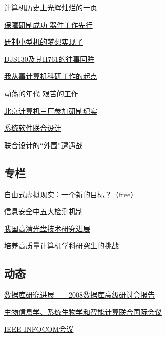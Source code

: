 \documentclass[a4paper]{article}
\begin{document}
\href{http://history.ccf.org.cn/resources/1190201776262/2010/04/15/039022.pdf}{计算机历史上光辉灿烂的一页}

\href{http://history.ccf.org.cn/resources/1190201776262/2010/04/15/039024.pdf}{保障研制成功 器件工作先行}

\href{http://history.ccf.org.cn/resources/1190201776262/2010/04/15/039027.pdf}{研制小型机的梦想实现了}

\href{http://history.ccf.org.cn/resources/1190201776262/2010/04/15/039030.pdf}{DJS130及其H761的往事回眸}

\href{http://history.ccf.org.cn/resources/1190201776262/2010/04/15/039035.pdf}{我从事计算机科研工作的起点}

\href{http://history.ccf.org.cn/resources/1190201776262/2010/04/15/039038.pdf}{动荡的年代  艰苦的工作}

\href{http://history.ccf.org.cn/resources/1190201776262/2010/04/15/039041.pdf}{北京计算机三厂参加研制纪实}

\href{http://history.ccf.org.cn/resources/1190201776262/2010/04/15/039043.pdf}{系统软件联合设计}

\href{http://history.ccf.org.cn/resources/1190201776262/2010/04/15/039044.pdf}{联合设计的“外围”遭遇战}

\subsection{专栏}
\href{http://history.ccf.org.cn/resources/1190201776262/2010/04/15/039048.pdf}{自由式虚拟现实：一个新的目标？（free）}

\href{http://history.ccf.org.cn/resources/1190201776262/2010/04/15/039054.pdf}{信息安全中五大检测机制}

\href{http://history.ccf.org.cn/resources/1190201776262/2010/04/15/039050.pdf}{我国高清光盘技术研究进展}

\href{http://history.ccf.org.cn/resources/1190201776262/2010/04/15/039052.pdf}{培养高质量计算机学科研究生的挑战}

\subsection{动态}
\href{http://history.ccf.org.cn/resources/1190201776262/2010/04/15/039058.pdf}{数据库研究进展——2008数据库高级研讨会报告}

\href{http://history.ccf.org.cn/resources/1190201776262/2010/04/15/039065.pdf}{生物信息学、系统生物学和智能计算联合国际会议}

\href{http://history.ccf.org.cn/resources/1190201776262/2010/04/15/039066.pdf}{IEEE INFOCOM会议}
\end{document}
